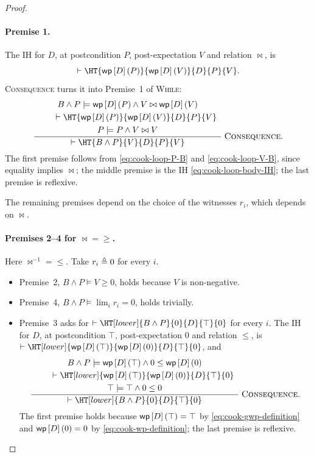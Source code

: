 \begin{proof}
\paragraph{Premise 1.}
The IH for $D$, at postcondition $P$, post-expectation $V$ and relation
$\bowtie$, is
\begin{equation}
  \vdash\HT{\WP{D}{P}}{\WP{D}{V}}{D}{P}{V}.
  \label{eq:cook-loop-body-IH}
\end{equation}
\textsc{Consequence} turns it into Premise~1 of \textsc{While}:
\begin{equation}
\frac{
  \begin{array}{c}
    B\land P\models\WP{D}{P}\land V\bowtie\WP{D}{V}
    \\[1mm]
    \qquad
    \vdash\HT{\WP{D}{P}}{\WP{D}{V}}{D}{P}{V}
    \\[1mm]
    P\models P\land V\bowtie V
  \end{array}
}{
  \vdash\HT{B\land P}{V}{D}{P}{V}
}\;\textsc{Consequence}.
\label{eq:cook-loop-premise1}
\end{equation}
The first premise follows from \eqref{eq:cook-loop-P-B} and
\eqref{eq:cook-loop-V-B}, since equality implies $\bowtie$; the middle premise
is the IH \eqref{eq:cook-loop-body-IH}; the last premise is reflexive.

The remaining premises depend on the choice of the witnesses $r_i$, which
depends on $\bowtie$.

\paragraph{Premises 2--4 for $\bowtie={\geq}$.}
Here $\bowtie^{-1}={\leq}$.  Take $r_i\triangleq0$ for every $i$.
\begin{itemize}
  \item Premise~2, $B\land P\models V\geq0$, holds because $V$ is
    non-negative.
  \item Premise~4, $B\land P\models\lim_i r_i=0$, holds trivially.
  \item Premise~3 asks for
    $\vdash\HT[lower]{B\land P}{0}{D}{\top}{0}$ for every $i$.  The IH for
    $D$, at postcondition $\top$, post-expectation $0$ and relation $\leq$, is
    $\vdash\HT[lower]{\WP{D}{\top}}{\WP{D}{0}}{D}{\top}{0}$, and
    \[
    \frac{
      \begin{array}{c}
        B\land P\models\WP{D}{\top}\land 0\leq\WP{D}{0}
        \\[1mm]
        \qquad
        \vdash\HT[lower]{\WP{D}{\top}}{\WP{D}{0}}{D}{\top}{0}
        \\[1mm]
        \top\models\top\land 0\leq 0
      \end{array}
    }{
      \vdash\HT[lower]{B\land P}{0}{D}{\top}{0}
    }\;\textsc{Consequence}.
    \]
    The first premise holds because $\mathsf{wp}\left[{D}\right]\left({\top}\right)=\top$ by
    \eqref{eq:cook-gwp-definition} and $\mathsf{wp}\left[{D}\right]\left({0}\right)=0$ by
    \eqref{eq:cook-wp-definition}; the last premise is reflexive.
\end{itemize}


\end{proof}
